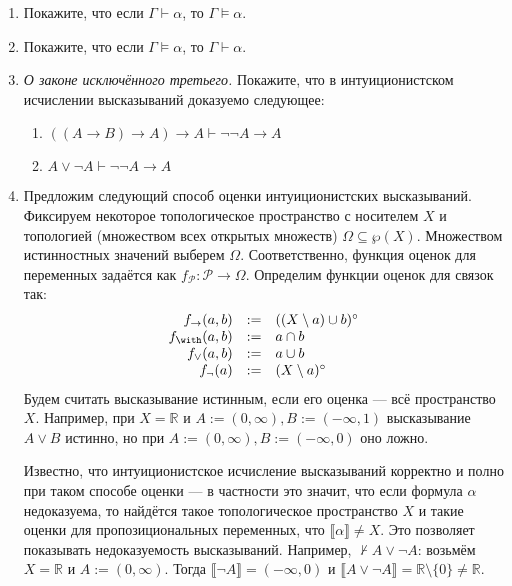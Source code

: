 \documentclass[10pt,a4paper,oneside]{article}
\begin{document}
\begin{enumerate}
\item Покажите, что если $\Gamma \vdash \alpha$, то $\Gamma \models \alpha$.

\item Покажите, что если $\Gamma \models \alpha$, то $\Gamma \vdash \alpha$.

\item \emph{О законе исключённого третьего.} Покажите, что в интуиционистском исчислении высказываний 
доказуемо следующее:

\begin{enumerate}
\item $((A\rightarrow B)\rightarrow A)\rightarrow A \vdash \neg\neg A \rightarrow A$
\item $A \vee \neg A \vdash \neg\neg A \rightarrow A$
\end{enumerate}

\item Предложим следующий способ оценки интуиционистских высказываний.
Фиксируем некоторое топологическое пространство с носителем $X$ и топологией
(множеством всех открытых множеств) $\Omega\subseteq\wp(X)$.
Множеством истинностных значений выберем $\Omega$.
Соответственно, функция оценок для переменных задаётся как $f_\mathcal{P}: \mathcal{P}\rightarrow\Omega$. 
Определим функции оценок для связок так:
$$\begin{array}{rcl}
f_\rightarrow(a,b) &:=& ((X\setminus a) \cup b)^\circ\\
f_\with(a,b) &:=& a \cap b\\
f_\vee(a,b) &:=& a \cup b\\
f_\neg(a) &:=& (X \setminus a)^\circ
\end{array}$$
Будем считать высказывание истинным, если его оценка --- всё пространство $X$.
Например, при $X = \mathbb{R}$ и $A := (0,\infty), B := (-\infty,1)$ высказывание $A\vee B$
истинно, но при $A := (0,\infty), B := (-\infty,0)$ оно ложно.

Известно, что интуиционистское исчисление высказываний корректно и полно при таком способе
оценки --- в частности это значит, что если формула $\alpha$ недоказуема, 
то найдётся такое топологическое пространство $X$
и такие оценки для пропозициональных переменных, что $\llbracket\alpha\rrbracket \neq X$.
Это позволяет показывать недоказуемость высказываний. Например, $\not\vdash A \vee \neg A$:
возьмём $X = \mathbb{R}$ и $A := (0,\infty)$. Тогда $\llbracket \neg A \rrbracket = (-\infty,0)$
и $\llbracket A \vee \neg A\rrbracket = \mathbb{R}\setminus\{0\} \ne \mathbb{R}$.


\end{enumerate}
\end{document}
